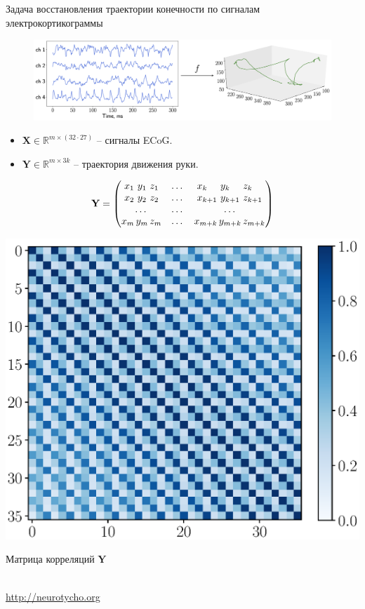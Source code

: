 \documentclass[10pt]{beamer}
\newcommand{\bX}{\mathbf{X}}
\newcommand{\bY}{\mathbf{Y}}
\newcommand{\bbR}{\mathbb{R}}
\begin{document}
\begin{frame}{Задача восстановления траектории конечности по сигналам электрокортикограммы}
    \begin{figure}
    	\includegraphics[width=0.85\linewidth]{figs/slide3_1}
    \end{figure}
	\begin{minipage}{.55\linewidth}
	\begin{itemize}
		\item $\bX \in \bbR^{m \times (32 \cdot 27)}$ -- сигналы ECoG.
		\item $\bY \in \bbR^{m \times 3k}$ -- траектория движения руки.
	\end{itemize}
	\vspace{0.1cm}
	\[
		\bY = 
		\begin{pmatrix}
		x_1 \,\, y_1 \,\, z_1 & \dots & x_{k\hphantom{+1}} \,\, y_{k\hphantom{+1}} \,\, z_{k\hphantom{+1}}\\
		x_2 \,\, y_2 \,\, z_2 & \dots & x_{k + 1} \,\, y_{k + 1} \,\, z_{k + 1}\\
		 \dots & \dots & \dots  \\
		x_m \, y_m \, z_m & \dots & x_{m + k} \, y_{m + k} \, z_{m + k}
		\end{pmatrix}
	\]
	\end{minipage}%
	\begin{minipage}{.43\linewidth}
		\includegraphics[width=0.9\linewidth]{figs/Y_corr_matrix.eps}
		\begin{center}
			\vspace{-0.4cm}
			Матрица корреляций $\bY$
			\vspace{-0.4cm}
		\end{center}
	\end{minipage}
	\\
	\url{http://neurotycho.org}
\end{frame}
\end{document}
